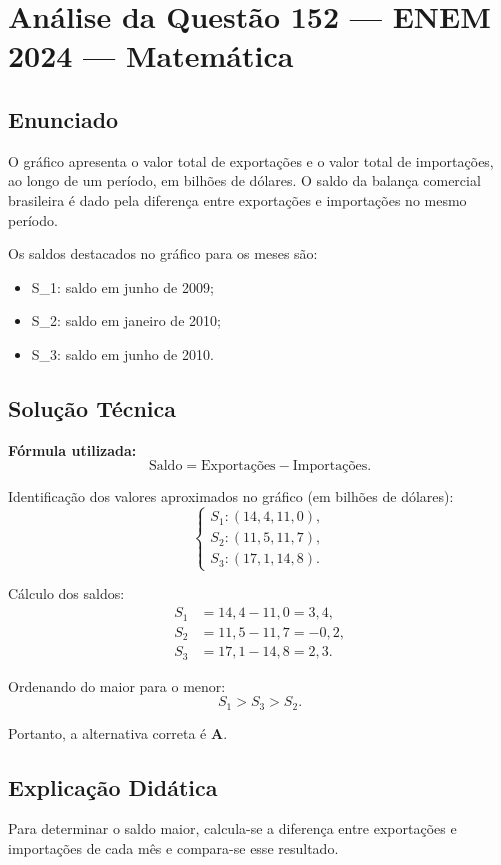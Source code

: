\documentclass{article}
\begin{document}
\section*{Análise da Questão 152 — ENEM 2024 — Matemática}

\subsection*{Enunciado}
O gráfico apresenta o valor total de exportações e o valor total de importações, ao longo de um período, em bilhões de dólares. O saldo da balança comercial brasileira é dado pela diferença entre exportações e importações no mesmo período.

Os saldos destacados no gráfico para os meses são:
\begin{itemize}
  \item S_1: saldo em junho de 2009;
  \item S_2: saldo em janeiro de 2010;
  \item S_3: saldo em junho de 2010.
\end{itemize}

\subsection*{Solução Técnica}
\textbf{Fórmula utilizada:}
\[
\text{Saldo} = \text{Exportações} - \text{Importações}.
\]

Identificação dos valores aproximados no gráfico (em bilhões de dólares):
\[
\begin{cases}
S_1: (14,4, 11,0), \\
S_2: (11,5, 11,7), \\
S_3: (17,1, 14,8).
\end{cases}
\]

Cálculo dos saldos:
\[
\begin{aligned}
S_1 &= 14,4 - 11,0 = 3,4, \\
S_2 &= 11,5 - 11,7 = -0,2, \\
S_3 &= 17,1 - 14,8 = 2,3.
\end{aligned}
\]

Ordenando do maior para o menor:
\[
S_1 > S_3 > S_2.
\]

Portanto, a alternativa correta é \textbf{A}.

\subsection*{Explicação Didática}
Para determinar o saldo maior, calcula-se a diferença entre exportações e importações de cada mês e compara-se esse resultado.
\end{document}
